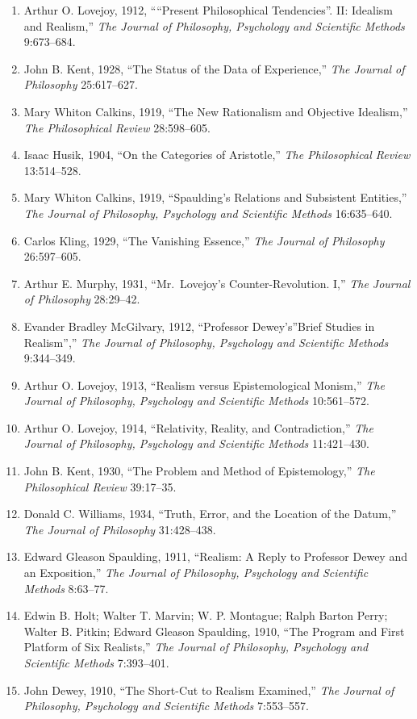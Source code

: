 \documentclass[
]{article}
\begin{document}
\begin{enumerate}
\def\labelenumi{\arabic{enumi}.}
\item
  Arthur O. Lovejoy, 1912, ````Present Philosophical Tendencies''. II:
  Idealism and Realism,'' \emph{The Journal of Philosophy, Psychology
  and Scientific Methods} 9:673--684.
\item
  John B. Kent, 1928, ``The Status of the Data of Experience,''
  \emph{The Journal of Philosophy} 25:617--627.
\item
  Mary Whiton Calkins, 1919, ``The New Rationalism and Objective
  Idealism,'' \emph{The Philosophical Review} 28:598--605.
\item
  Isaac Husik, 1904, ``On the Categories of Aristotle,'' \emph{The
  Philosophical Review} 13:514--528.
\item
  Mary Whiton Calkins, 1919, ``Spaulding's Relations and Subsistent
  Entities,'' \emph{The Journal of Philosophy, Psychology and Scientific
  Methods} 16:635--640.
\item
  Carlos Kling, 1929, ``The Vanishing Essence,'' \emph{The Journal of
  Philosophy} 26:597--605.
\item
  Arthur E. Murphy, 1931, ``Mr.~Lovejoy's Counter-Revolution. I,''
  \emph{The Journal of Philosophy} 28:29--42.
\item
  Evander Bradley McGilvary, 1912, ``Professor Dewey's''Brief Studies in
  Realism'','' \emph{The Journal of Philosophy, Psychology and
  Scientific Methods} 9:344--349.
\item
  Arthur O. Lovejoy, 1913, ``Realism versus Epistemological Monism,''
  \emph{The Journal of Philosophy, Psychology and Scientific Methods}
  10:561--572.
\item
  Arthur O. Lovejoy, 1914, ``Relativity, Reality, and Contradiction,''
  \emph{The Journal of Philosophy, Psychology and Scientific Methods}
  11:421--430.
\item
  John B. Kent, 1930, ``The Problem and Method of Epistemology,''
  \emph{The Philosophical Review} 39:17--35.
\item
  Donald C. Williams, 1934, ``Truth, Error, and the Location of the
  Datum,'' \emph{The Journal of Philosophy} 31:428--438.
\item
  Edward Gleason Spaulding, 1911, ``Realism: A Reply to Professor Dewey
  and an Exposition,'' \emph{The Journal of Philosophy, Psychology and
  Scientific Methods} 8:63--77.
\item
  Edwin B. Holt; Walter T. Marvin; W. P. Montague; Ralph Barton Perry;
  Walter B. Pitkin; Edward Gleason Spaulding, 1910, ``The Program and
  First Platform of Six Realists,'' \emph{The Journal of Philosophy,
  Psychology and Scientific Methods} 7:393--401.
\item
  John Dewey, 1910, ``The Short-Cut to Realism Examined,'' \emph{The
  Journal of Philosophy, Psychology and Scientific Methods} 7:553--557.
\end{enumerate}
\end{document}
